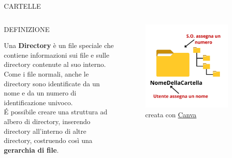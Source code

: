 \documentclass[aspectratio=1610]{beamer}
\begin{document}
\begin{frame}{CARTELLE}
    \begin{columns}
            \begin{alertblock}{DEFINIZIONE}
                \begin{minipage}{0.97\linewidth}
                    \justifying
                    Una \textbf{Directory} è un file speciale che contiene informazioni sui file e sulle directory 
                    contenute al suo interno. Come i file normali, anche le directory sono identificate da un nome 
                    e da un numero di identificazione univoco.\\
                    \'E possibile creare una struttura ad albero di directory, inserendo directory all'interno di altre 
                    directory, costruendo così una \textbf{gerarchia di file}.\\
                \end{minipage}
            \end{alertblock}
            \begin{figure}
                \includegraphics[width=\linewidth]{img/cartella.jpg}
                \caption{{creata con \href{https://www.canva.com/}{Canva}}}
            \end{figure}
    \end{columns}
\end{frame}
\end{document}
